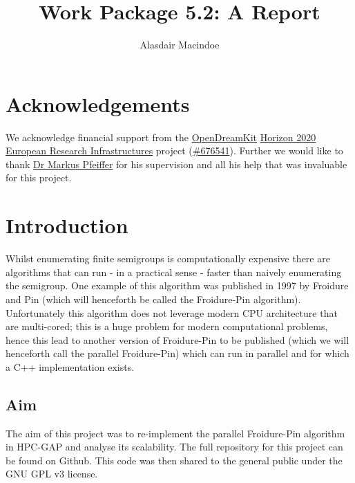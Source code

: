 \documentclass{report}
\author{Alasdair Macindoe}
\date{}
\title{Work Package 5.2: A Report}
\begin{document}
\maketitle

\section*{Acknowledgements}
We acknowledge financial support from the \href{http://opendreamkit.org/}{OpenDreamKit} \href{https://ec.europa.eu/programmes/horizon2020/}{Horizon 2020}
\href{https://ec.europa.eu/programmes/horizon2020/en/h2020-section/european-research-infrastructures-including-e-infrastructures}{European Research Infrastructures}
project (\href{http://cordis.europa.eu/project/rcn/198334_en.html}{\#676541}).
Further we would like to thank \href{https://www.cs.st-andrews.ac.uk/directory/person?id=mp397}{Dr Markus Pfeiffer} for his supervision and all his help that was invaluable for this project.

\section*{Introduction}
Whilst enumerating finite semigroups is computationally expensive there are algorithms that can run - in a practical sense - faster than naively enumerating the semigroup. One example of this algorithm was published in 1997 by Froidure and Pin\cite{fpin} (which will henceforth be called the Froidure-Pin algorithm).
Unfortunately this algorithm does not leverage modern CPU architecture that are multi-cored; this is a huge problem for modern computational problems, hence this lead to another version of Froidure-Pin to be published\cite{cfp} (which we will henceforth call the parallel Froidure-Pin) which can run in parallel and for which a C++ implementation exists\cite{cfpcpp}.

\subsection*{Aim}
The aim of this project was to re-implement the parallel Froidure-Pin algorithm in HPC-GAP\cite{GAP4} and analyse its scalability.
The full repository for this project can be found on Github\cite{project}. This code was then shared to the general public under
the GNU GPL v3 license.
\end{document}
